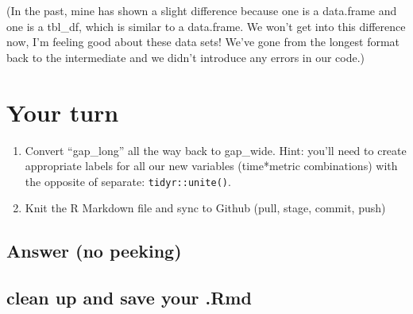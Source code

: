 \documentclass[]{book}
\newenvironment{Shaded}{\begin{snugshade}}{\end{snugshade}}
\newcommand{\KeywordTok}[1]{\textcolor[rgb]{0.13,0.29,0.53}{\textbf{#1}}}
\newcommand{\DataTypeTok}[1]{\textcolor[rgb]{0.13,0.29,0.53}{#1}}
\newcommand{\StringTok}[1]{\textcolor[rgb]{0.31,0.60,0.02}{#1}}
\newcommand{\CommentTok}[1]{\textcolor[rgb]{0.56,0.35,0.01}{\textit{#1}}}
\newcommand{\OperatorTok}[1]{\textcolor[rgb]{0.81,0.36,0.00}{\textbf{#1}}}
\newcommand{\NormalTok}[1]{#1}
\theoremstyle{definition}
\theoremstyle{definition}
\theoremstyle{definition}
\theoremstyle{remark}
\begin{document}
(In the past, mine has shown a slight difference because one is a
data.frame and one is a tbl\_df, which is similar to a data.frame. We
won't get into this difference now, I'm feeling good about these data
sets! We've gone from the longest format back to the intermediate and we
didn't introduce any errors in our code.)

\section{Your turn}\label{your-turn-13}

\begin{enumerate}
\def\labelenumi{\arabic{enumi}.}
\item
  Convert ``gap\_long'' all the way back to gap\_wide. Hint: you'll need
  to create appropriate labels for all our new variables (time*metric
  combinations) with the opposite of separate: \texttt{tidyr::unite()}.
\item
  Knit the R Markdown file and sync to Github (pull, stage, commit,
  push)
\end{enumerate}

\subsection{Answer (no peeking)}\label{answer-no-peeking-2}

\begin{Shaded}
\end{Shaded}

\subsection{clean up and save your
.Rmd}\label{clean-up-and-save-your-.rmd}
\end{document}
